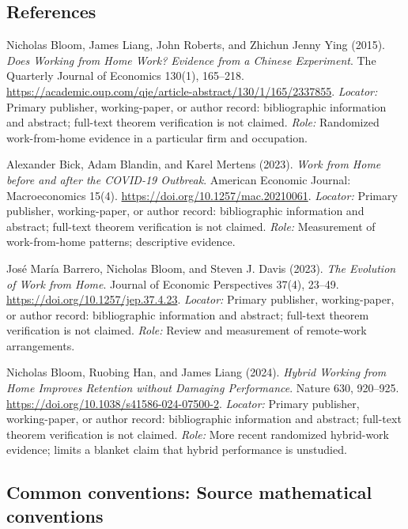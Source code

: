 \documentclass[11pt,a4paper]{article}
\begin{document}
\subsection*{References}
\begin{enumerate}[label=\textnormal{[S\arabic*]},leftmargin=*]
\item Nicholas Bloom, James Liang, John Roberts, and Zhichun Jenny Ying (2015). \emph{Does Working from Home Work? Evidence from a Chinese Experiment}. The Quarterly Journal of Economics 130(1), 165--218. \url{https://academic.oup.com/qje/article-abstract/130/1/165/2337855}. \textit{Locator:} Primary publisher, working-paper, or author record: bibliographic information and abstract; full-text theorem verification is not claimed. \textit{Role:} Randomized work-from-home evidence in a particular firm and occupation.
\item Alexander Bick, Adam Blandin, and Karel Mertens (2023). \emph{Work from Home before and after the COVID-19 Outbreak}. American Economic Journal: Macroeconomics 15(4). \url{https://doi.org/10.1257/mac.20210061}. \textit{Locator:} Primary publisher, working-paper, or author record: bibliographic information and abstract; full-text theorem verification is not claimed. \textit{Role:} Measurement of work-from-home patterns; descriptive evidence.
\item José María Barrero, Nicholas Bloom, and Steven J. Davis (2023). \emph{The Evolution of Work from Home}. Journal of Economic Perspectives 37(4), 23--49. \url{https://doi.org/10.1257/jep.37.4.23}. \textit{Locator:} Primary publisher, working-paper, or author record: bibliographic information and abstract; full-text theorem verification is not claimed. \textit{Role:} Review and measurement of remote-work arrangements.
\item Nicholas Bloom, Ruobing Han, and James Liang (2024). \emph{Hybrid Working from Home Improves Retention without Damaging Performance}. Nature 630, 920--925. \url{https://doi.org/10.1038/s41586-024-07500-2}. \textit{Locator:} Primary publisher, working-paper, or author record: bibliographic information and abstract; full-text theorem verification is not claimed. \textit{Role:} More recent randomized hybrid-work evidence; limits a blanket claim that hybrid performance is unstudied.
\end{enumerate}

\subsection*{Common conventions: Source mathematical conventions}
\end{document}
